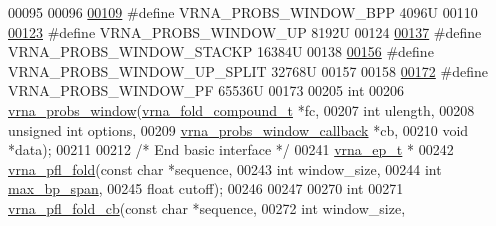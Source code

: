 \begin{DoxyCode}
00095 
00096 
\hyperlink{group__part__func__window_ga296217b76e76e5f7e6927e7210aa9b1f}{00109} \textcolor{preprocessor}{#define VRNA\_PROBS\_WINDOW\_BPP  4096U}
00110 
\hyperlink{group__part__func__window_ga18325811c7dfc7b7d9d4ac37f4353615}{00123} \textcolor{preprocessor}{#define VRNA\_PROBS\_WINDOW\_UP   8192U}
00124 
\hyperlink{group__part__func__window_ga0a13fc668b02f21b225e2334e4caac08}{00137} \textcolor{preprocessor}{#define VRNA\_PROBS\_WINDOW\_STACKP   16384U}
00138 
\hyperlink{group__part__func__window_ga9068f4ec008bf1c042a9357f5c2c5e13}{00156} \textcolor{preprocessor}{#define VRNA\_PROBS\_WINDOW\_UP\_SPLIT   32768U}
00157 
00158 
\hyperlink{group__part__func__window_ga4b79137d9b28b1f9cac7983792ce34a0}{00172} \textcolor{preprocessor}{#define VRNA\_PROBS\_WINDOW\_PF        65536U}
00173 
00205 \textcolor{keywordtype}{int}
00206 \hyperlink{group__part__func__window_ga7115d012988541a65ec323c5f17a334b}{vrna\_probs\_window}(\hyperlink{group__fold__compound_structvrna__fc__s}{vrna\_fold\_compound\_t}        *fc,
00207                   \textcolor{keywordtype}{int}                         ulength,
00208                   \textcolor{keywordtype}{unsigned} \textcolor{keywordtype}{int}                options,
00209                   \hyperlink{group__part__func__window_gabe710a1182e6db69cc75329dfc9bed67}{vrna\_probs\_window\_callback}  *cb,
00210                   \textcolor{keywordtype}{void}                        *data);
00211 
00212 \textcolor{comment}{/* End basic interface */}
00241 \hyperlink{group__struct__utils__plist_structvrna__elem__prob__s}{vrna\_ep\_t} *
00242 \hyperlink{group__part__func__window_ga6267230f20cab0e2315375310b4dad85}{vrna\_pfl\_fold}(\textcolor{keyword}{const} \textcolor{keywordtype}{char}  *sequence,
00243               \textcolor{keywordtype}{int}         window\_size,
00244               \textcolor{keywordtype}{int}         \hyperlink{group__model__details_ga18df869af0d70101106458fc3f027806}{max\_bp\_span},
00245               \textcolor{keywordtype}{float}       cutoff);
00246 
00247 
00270 \textcolor{keywordtype}{int}
00271 \hyperlink{group__part__func__window_ga457a60751b2a5225477e3b7735636a5f}{vrna\_pfl\_fold\_cb}(\textcolor{keyword}{const} \textcolor{keywordtype}{char}                 *sequence,
00272                  \textcolor{keywordtype}{int}                        window\_size,

\end{DoxyCode}
